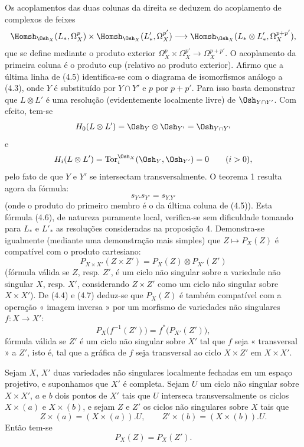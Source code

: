 Os acoplamentos das duas colunas da direita se deduzem do acoplamento de
complexos de feixes
\[
\Homsh_{\Osh_X}(L_{*},\Omega_X^{p})
\times\Homsh_{\Osh_X}(L'_{*},\Omega_X^{p'})
\longrightarrow
\Homsh_{\Osh_X}(L_{*}\otimes L'_{*},\Omega_X^{p+p'}),
\]
que se define mediante o produto exterior
$\Omega_X^{p}\times\Omega_X^{p'}\longrightarrow\Omega_X^{p+p'}$.
O acoplamento da primeira coluna é o produto cup (relativo ao produto
exterior). Afirmo que a última linha de (4.5) identifica-se com o diagrama
de isomorfismos análogo a (4.3), onde $Y$ é substituído por $Y\cap Y'$ e $p$ por
$p+p'$. Para isso basta demonstrar que $L\otimes L'$ é uma resolução
(evidentemente localmente livre) de $\Osh_{Y\cap Y'}$. Com efeito, tem-se
\[
  H_0(L\otimes L')=\Osh_Y\otimes\Osh_{Y'}=\Osh_{Y\cap Y'}
\]
e
\[
  H_i(L\otimes L')=\operatorname{Tor}_{i}^{\Osh_X}(\Osh_Y,\Osh_{Y'})=0
  \qquad(i>0),
\]
pelo fato de que $Y$ e $Y'$ se intersectam transversalmente. O teorema 1 resulta
agora da fórmula:
\begin{equation}\tag{4.6}
  s_Y.s_{Y'}=s_{Y.Y'}
\end{equation}
(onde o produto do primeiro membro é o da última coluna de (4.5)).
Esta fórmula (4.6), de natureza puramente local, verifica-se sem dificuldade
tomando para $L_{*}$ e $L'_{*}$ as resoluções consideradas na proposição
4. Demonstra-se igualmente (mediante uma demonstração mais simples) que
$Z\longmapsto P_X(Z)$ é compatível com o produto cartesiano:
\begin{equation}\tag{4.7}
  P_{X\times X'}(Z\times Z')=P_X(Z)\otimes P_{X'}(Z')
\end{equation}
(fórmula válida se $Z$, resp. $Z'$, é um ciclo não singular sobre a variedade
não singular $X$, resp. $X'$, considerando $Z\times Z'$ como um ciclo não
singular sobre $X\times X'$). De (4.4) e (4.7) deduz-se que $P_X(Z)$ é também
compatível com a operação « imagem inversa » por um morfismo de variedades não
singulares $f:X\longrightarrow X'$:
\begin{equation}\tag{4.8}
  P_X\bigl(f^{-1}(Z')\bigr)=f^{*}\bigl(P_{X'}(Z')\bigr),
\end{equation}
fórmula válida se $Z'$ é um ciclo não singular sobre $X'$ tal que $f$ seja
« transversal » a $Z'$, isto é, tal que a gráfica de $f$ seja transversal ao ciclo
$X\times Z'$ em $X\times X'$.

 Sejam $X$, $X'$ duas variedades não singulares
localmente fechadas em um espaço projetivo, e suponhamos que $X'$ é completa. Sejam $U$
um ciclo não singular sobre $X\times X'$, $a$ e $b$ dois pontos de $X'$ tais que
$U$ interseca transversalmente os ciclos $X\times(a)$ e $X\times(b)$, e sejam $Z$
e $Z'$ os ciclos não singulares sobre $X$ tais que
\[
  Z\times(a)=(X\times(a)).U,
  \qquad
  Z'\times(b)=(X\times(b)).U.
\]
Então tem-se
\[
  P_X(Z)=P_X(Z').
\]

